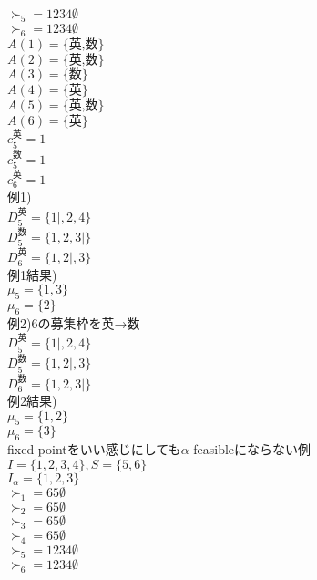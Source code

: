 \documentclass[a4j,10pt]{jsarticle}
\theoremstyle{definition}
\theoremstyle{remark}
\theoremstyle{plain}
\begin{document}
\begin{tcolorbox}[enhanced,breakable=true]
$\succ_5 = 1234\emptyset$\\
$\succ_6 = 1234\emptyset$\\



$A(1) = \{\text{英,数}\}$\\
$A(2) = \{\text{英,数}\}$\\
$A(3) = \{\text{数}\}$\\
$A(4) = \{\text{英}\}$\\


$A(5) = \{\text{英,数}\}$\\
$A(6) = \{\text{英}\}$\\

$c_5^{\text{英}} = 1$\\
$c_5^{\text{数}} = 1$\\
$c_6^{\text{英}} = 1$\\

例1)\\
$D_5^{\text{英}} = \{1|,2,4\}$\\
$D_5^{\text{数}} = \{1,2,3|\}$\\
$D_6^{\text{英}} = \{1,2|,3\}$\\

例1結果)\\
$\mu_5 = \{1,3\}$\\
$\mu_6 = \{2\}$\\

例2)6の募集枠を英→数\\
$D_5^{\text{英}} = \{1|,2,4\}$\\
$D_5^{\text{数}} = \{1,2|,3\}$\\
$D_6^{\text{数}} = \{1,2,3|\}$\\

例2結果)\\
$\mu_5 = \{1,2\}$\\
$\mu_6 = \{3\}$\\

fixed pointをいい感じにしても$\alpha$-feasibleにならない例\\
$I = \{1,2,3,4\}, S = \{5,6\}$\\
$I_\alpha = \{1,2,3\}$\\
$\succ_1 = 65\emptyset$\\
$\succ_2 = 65\emptyset$\\
$\succ_3 = 65\emptyset$\\
$\succ_4 = 65\emptyset$\\


$\succ_5 = 1234\emptyset$\\
$\succ_6 = 1234\emptyset$\\




\end{tcolorbox}
\end{document}
